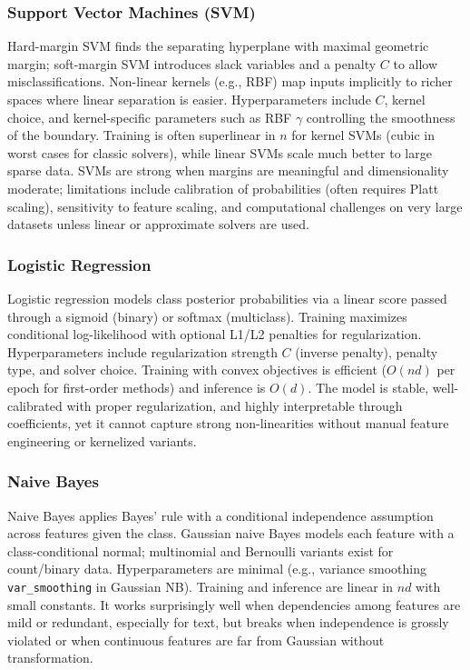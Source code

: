\documentclass[11pt,a4paper]{article}
\begin{document}
\subsubsection{Support Vector Machines (SVM)}
Hard-margin SVM finds the separating hyperplane with maximal geometric margin; soft-margin SVM introduces slack variables and a penalty $C$ to allow misclassifications. Non-linear kernels (e.g., RBF) map inputs implicitly to richer spaces where linear separation is easier. Hyperparameters include $C$, kernel choice, and kernel-specific parameters such as RBF $\gamma$ controlling the smoothness of the boundary. Training is often superlinear in $n$ for kernel SVMs (cubic in worst cases for classic solvers), while linear SVMs scale much better to large sparse data. SVMs are strong when margins are meaningful and dimensionality moderate; limitations include calibration of probabilities (often requires Platt scaling), sensitivity to feature scaling, and computational challenges on very large datasets unless linear or approximate solvers are used.

\subsubsection{Logistic Regression}
Logistic regression models class posterior probabilities via a linear score passed through a sigmoid (binary) or softmax (multiclass). Training maximizes conditional log-likelihood with optional L1/L2 penalties for regularization. Hyperparameters include regularization strength $C$ (inverse penalty), penalty type, and solver choice. Training with convex objectives is efficient ($O(n d)$ per epoch for first-order methods) and inference is $O(d)$. The model is stable, well-calibrated with proper regularization, and highly interpretable through coefficients, yet it cannot capture strong non-linearities without manual feature engineering or kernelized variants.

\subsubsection{Naive Bayes}
Naive Bayes applies Bayes' rule with a conditional independence assumption across features given the class. Gaussian naive Bayes models each feature with a class-conditional normal; multinomial and Bernoulli variants exist for count/binary data. Hyperparameters are minimal (e.g., variance smoothing \texttt{var\_smoothing} in Gaussian NB). Training and inference are linear in $n d$ with small constants. It works surprisingly well when dependencies among features are mild or redundant, especially for text, but breaks when independence is grossly violated or when continuous features are far from Gaussian without transformation.
\end{document}
